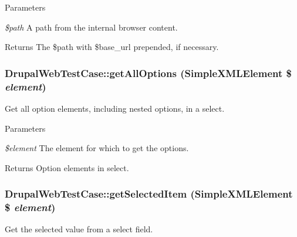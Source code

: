 \begin{DoxyParams}{Parameters}
\item[{\em \$path}]A path from the internal browser content. \end{DoxyParams}
\begin{DoxyReturn}{Returns}
The \$path with \$base\_\-url prepended, if necessary. 
\end{DoxyReturn}
\hypertarget{classDrupalWebTestCase_a242a13b4aaf558f5b4030c0ad2b3789c}{
\subsubsection[{getAllOptions}]{\setlength{\rightskip}{0pt plus 5cm}DrupalWebTestCase::getAllOptions (SimpleXMLElement \$ {\em element})}}
\label{classDrupalWebTestCase_a242a13b4aaf558f5b4030c0ad2b3789c}
Get all option elements, including nested options, in a select.


\begin{DoxyParams}{Parameters}
\item[{\em \$element}]The element for which to get the options. \end{DoxyParams}
\begin{DoxyReturn}{Returns}
Option elements in select. 
\end{DoxyReturn}
\hypertarget{classDrupalWebTestCase_a4f24b7eddfb7d495f4ad8592f0b24929}{
\subsubsection[{getSelectedItem}]{\setlength{\rightskip}{0pt plus 5cm}DrupalWebTestCase::getSelectedItem (SimpleXMLElement \$ {\em element})}}
\label{classDrupalWebTestCase_a4f24b7eddfb7d495f4ad8592f0b24929}
Get the selected value from a select field.


